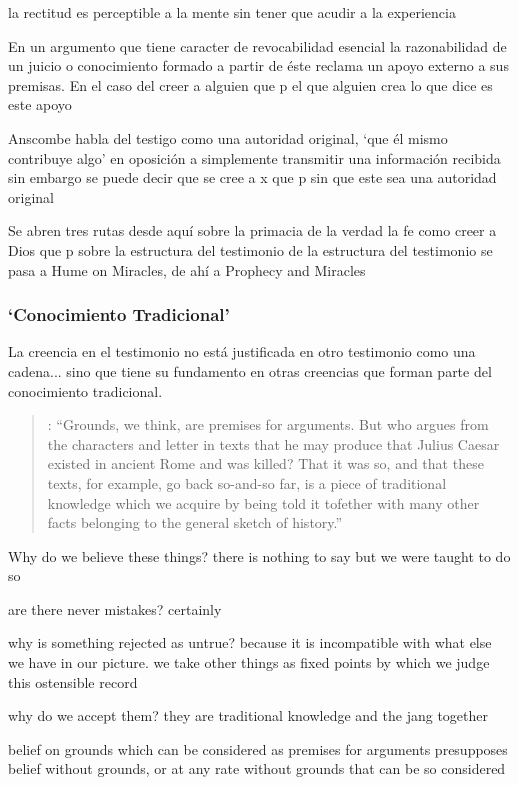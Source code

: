 la rectitud es perceptible a la mente sin tener que acudir a la experiencia



En un argumento que tiene caracter de revocabilidad esencial la razonabilidad de un juicio o conocimiento formado a partir de éste reclama un apoyo externo a sus premisas. En el caso del creer a alguien que p el que alguien crea lo que dice es este apoyo

Anscombe habla del testigo como una autoridad original, `que él mismo contribuye algo' en oposición a simplemente transmitir una información recibida sin embargo se puede decir que se cree a x que p sin que este sea una autoridad original

Se abren tres rutas desde aquí sobre la primacia de la verdad la fe como creer a Dios que p sobre la estructura del testimonio de la estructura del testimonio se pasa a Hume on Miracles, de ahí a Prophecy and Miracles

\subsubsection{`Conocimiento Tradicional'}

La creencia en el testimonio no está justificada en otro testimonio como una cadena... sino que tiene su fundamento en otras creencias que forman parte del conocimiento tradicional.

\blockquote[{\cite[121--122]{anscombe2015logic:grounds}}: \enquote{Grounds, we think, are premises for arguments. But who argues from the characters and letter in texts that he may produce that Julius Caesar existed in ancient Rome and was killed? That it was so, and that these texts, for example, go back so-and-so far, is a piece of traditional knowledge which we acquire by being told it tofether with many other facts belonging to the general sketch of history.}]{}

Why do we believe these things? there is nothing to say but we were taught to do so

are there never mistakes? certainly

why is something rejected as untrue? because it is incompatible with what else we have in our picture. we take other things as fixed points by which we judge this ostensible record

why do we accept them? they are traditional knowledge and the jang together

belief on grounds which can be considered as premises for arguments presupposes belief without grounds, or at any rate without grounds that can be so considered



